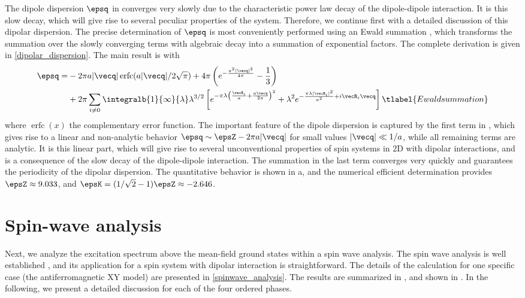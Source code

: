 The dipole dispersion $\epsq$ in 
converges very slowly due to the characteristic power law decay of the dipole-dipole
interaction. It is this slow decay, which will give rise to several peculiar
properties of the system. Therefore, we continue first with a detailed discussion
of this dipolar dispersion. The precise determination of $\epsq$ is
most conveniently performed using an Ewald summation \cite{Bonsall1977}, which transforms
the summation over the slowly converging terms with algebraic decay into a summation of exponential factors.
The complete derivation is given in \cref{dipolar_dispersion}. The main result is  with
%
\begin{align}
    \epsq   = &- 2 \pi a | {\vecq}|\operatorname{erfc}(a |{\vecq}|/2\sqrt{\pi})   + 4 \pi \left( e^{- \frac{a^2 |{\vecq}|^2}{4 \pi}} - \frac{1}{3}\right)
\\
   & +     2 \pi \sum_{i\neq 0} \integralb{1}{\infty}{\lambda} \lambda^{3/2} \left[ e^{- \pi  \lambda \left(\frac{ {\vecR}_{i}}{a} + \frac{a {\vecq}}{2 \pi}\right)^2} +\lambda^{2}  e^{- \frac{\pi \lambda |{\vecR}_{i}|^2}{a^2}+ i {\vecR}_{i}{\vecq}}\right]\tlabel{Ewaldsummation}
\end{align}
%
where $\operatorname{erfc}(x)$ the complementary error function. The important feature of the dipole
dispersion is captured by the first term in , which
gives rise to a linear and non-analytic behavior $\epsq \sim
\epsZ - 2 \pi a |\vecq|$ for small values $|\vecq| \ll 1/a $, while all
remaining terms are analytic. It is this linear part, which will give rise to
several unconventional properties of spin systems in 2D with dipolar
interactions, and is a consequence of the slow decay of the dipole-dipole
interaction. The summation in the last term converges very quickly and
guarantees the periodicity of the dipolar dispersion. The quantitative behavior
is shown in a, and the numerical efficient determination provides
$\epsZ\approx 9.033$, and $\epsK=(1/\sqrt{2}-1) \epsZ
\approx -2.646$. %


\section{Spin-wave analysis}

Next, we analyze the excitation spectrum above the mean-field ground states
within a spin wave analysis. The spin wave analysis is well
established \cite{Kubo1952,Auerbach1994}, and its application for a spin system with dipolar
interaction is straightforward. The details of the calculation for one specific case (the
antiferromagnetic XY model) are presented in \cref{spinwave_analysis}. The results are
summarized in , and shown in . In the following, we present a detailed
discussion for each of the four ordered phases.




